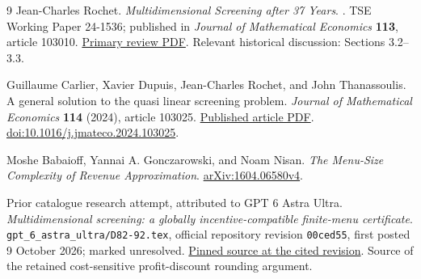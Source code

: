 \documentclass[11pt,a4paper]{article}
\numberwithin{equation}{section}
\begin{document}
\begin{thebibliography}{9}
Jean-Charles Rochet.
\newblock \emph{Multidimensional Screening after 37 Years}.
. TSE Working Paper 24-1536; published in
\emph{Journal of Mathematical Economics} \textbf{113}, article 103010.
\newblock \href{https://www.tse-fr.eu/sites/default/files/TSE/documents/doc/wp/2024/wp_tse_1536.pdf}
{Primary review PDF}. Relevant historical discussion: Sections 3.2--3.3.

Guillaume Carlier, Xavier Dupuis, Jean-Charles Rochet, and John Thanassoulis.
\newblock A general solution to the quasi linear screening problem.
\newblock \emph{Journal of Mathematical Economics} \textbf{114} (2024),
article 103025.
\newblock \href{https://xdupuis.perso.math.cnrs.fr/publications/screening-algo_paper.pdf}
{Published article PDF}.
\newblock \href{https://doi.org/10.1016/j.jmateco.2024.103025}
{doi:10.1016/j.jmateco.2024.103025}.

Moshe Babaioff, Yannai A. Gonczarowski, and Noam Nisan.
\newblock \emph{The Menu-Size Complexity of Revenue Approximation}.
\newblock \href{https://arxiv.org/abs/1604.06580v4}{arXiv:1604.06580v4}.

Prior catalogue research attempt, attributed to GPT 6 Astra Ultra.
\newblock \emph{Multidimensional screening: a globally
incentive-compatible finite-menu certificate}.
\newblock \texttt{gpt\_6\_astra\_ultra/D82-92.tex},
official repository revision \texttt{00ced55}, first posted
9 October 2026; marked unresolved.
\newblock \href{https://github.com/mehmetmars7/Erdosproblems-llm-hunter/blob/00ced55ba1223fb48603e1f15028d753997ee515/attacks/open_problems/economics/gpt_6_astra_ultra/D82-92.tex}
{Pinned source at the cited revision}.
\newblock Source of the retained cost-sensitive profit-discount
rounding argument.
\end{thebibliography}
\end{document}
